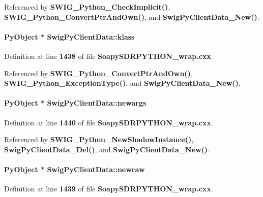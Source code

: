 Referenced by {\bf S\+W\+I\+G\+\_\+\+Python\+\_\+\+Check\+Implicit()}, {\bf S\+W\+I\+G\+\_\+\+Python\+\_\+\+Convert\+Ptr\+And\+Own()}, and {\bf Swig\+Py\+Client\+Data\+\_\+\+New()}.

\paragraph[{klass}]{\setlength{\rightskip}{0pt plus 5cm}Py\+Object $\ast$ Swig\+Py\+Client\+Data\+::klass}\label{structSwigPyClientData_afe15f48c719784bf245534c4999ea387}


Definition at line {\bf 1438} of file {\bf Soapy\+S\+D\+R\+P\+Y\+T\+H\+O\+N\+\_\+wrap.\+cxx}.



Referenced by {\bf S\+W\+I\+G\+\_\+\+Python\+\_\+\+Convert\+Ptr\+And\+Own()}, {\bf S\+W\+I\+G\+\_\+\+Python\+\_\+\+Exception\+Type()}, and {\bf Swig\+Py\+Client\+Data\+\_\+\+New()}.

\paragraph[{newargs}]{\setlength{\rightskip}{0pt plus 5cm}Py\+Object $\ast$ Swig\+Py\+Client\+Data\+::newargs}\label{structSwigPyClientData_a8080712504b1249851e64d0baa3926bb}


Definition at line {\bf 1440} of file {\bf Soapy\+S\+D\+R\+P\+Y\+T\+H\+O\+N\+\_\+wrap.\+cxx}.



Referenced by {\bf S\+W\+I\+G\+\_\+\+Python\+\_\+\+New\+Shadow\+Instance()}, {\bf Swig\+Py\+Client\+Data\+\_\+\+Del()}, and {\bf Swig\+Py\+Client\+Data\+\_\+\+New()}.

\paragraph[{newraw}]{\setlength{\rightskip}{0pt plus 5cm}Py\+Object $\ast$ Swig\+Py\+Client\+Data\+::newraw}\label{structSwigPyClientData_aef35885524e7defa5cbcc00714c4a5c1}


Definition at line {\bf 1439} of file {\bf Soapy\+S\+D\+R\+P\+Y\+T\+H\+O\+N\+\_\+wrap.\+cxx}.



